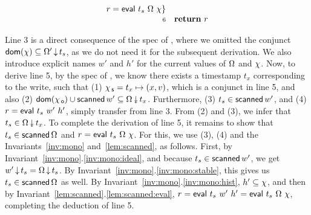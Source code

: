 \[\begin{array}{r l}
{%
               r = \eval\ t_s\ \stableorder\ \hist\}}\\
 \num{6} & \kw{return}\ r
\end{array}
\]

Line 3 is a direct consequence of the spec of \jyscan, where we
omitted the conjunct $\mathsf{dom}(\chi) \subseteq
\Omega'\,{\downarrow}\,t_s$, as we do not need it for the subsequent
derivation. We also introduce explicit names $w'$ and $h'$ for the
current values of $\Omega$ and $\chi$.
%
Now, to derive line 5, by the spec of \jywrite, we know there exists a
timestamp $t_x$ corresponding to the write, such that (1) $\chi_{\, \mathsf{s}} =
t_x \mapsto (x, v)$, which is a conjunct in line 5, and also (2)
$\dom{\histO} \cup \scanned{w'} \subseteq
\sideal{\stableorder}{t_x}$. Furthermore, (3) $t_s \in \mathsf{scanned}\,w'$,
and (4) $r = \mathsf{eval}\ t_s\ w'\ h'$, simply transfer from line 3. From
(2) and (3), we infer that $t_s \in \sideal{\stableorder}{t_x}$. To
complete the derivation of line 5, it remains to show that $t_s \in
\mathsf{scanned}\,\Omega$ and $r = \mathsf{eval}\ t_s\ \Omega\ \chi$. For
this, we use (3), (4) and the Invariants~\ref{inv:mono}
and~\ref{lem:scanned}, as follows.  First, by
Invariant~\ref{inv:mono}.\ref{inv:mono:ideal}, and because $t_s \in
\mathsf{scanned}\,w'$, we get $w'\,{\downarrow}\,t_s =
\Omega\,{\downarrow}\,t_s$. By
Invariant~\ref{inv:mono}.\ref{inv:mono:stable}, this gives us $t_s \in
\mathsf{scanned}\,\Omega$ as well. By
Invariant~\ref{inv:mono}.\ref{inv:mono:hist}, $h' \subseteq \chi$,
and then by Invariant~\ref{lem:scanned}.\ref{lem:scanned:eval}, $r =
\mathsf{eval}\ t_s\ w'\ h' = \mathsf{eval}\ t_s\ \Omega\ \chi$, completing the
deduction of line 5.

